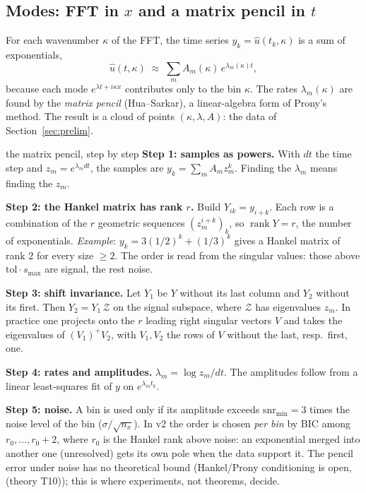 \documentclass[11pt,a4paper]{article}
\theoremstyle{definition}
\newcommand{\thy}[1]{\textcolor{cG}{\textsf{\footnotesize(theory #1)}}}
\begin{document}
\subsection{Modes: FFT in $x$ and a matrix pencil in $t$}\label{sec:modes}
For each wavenumber $\kappa$ of the FFT, the time series $y_k=\hat u(t_k,\kappa)$ is a sum of exponentials,
\begin{equation}\label{eq:expsum}
\hat u(t,\kappa)\;\approx\;\sum_{m}A_m(\kappa)\,e^{\lambda_m(\kappa)t},
\end{equation}
because each mode $e^{\lambda t+i\kappa x}$ contributes only to the bin $\kappa$. The rates $\lambda_m(\kappa)$ are found by the \emph{matrix pencil} (Hua--Sarkar), a linear-algebra form of Prony's method. The result is a cloud of points $(\kappa,\lambda,A)$: the data of Section~\ref{sec:prelim}.

\begin{explained}{the matrix pencil, step by step}
\textbf{Step 1: samples as powers.} With $dt$ the time step and $z_m=e^{\lambda_mdt}$, the samples are $y_k=\sum_mA_mz_m^k$. Finding the $\lambda_m$ means finding the $z_m$.

\medskip\textbf{Step 2: the Hankel matrix has rank $r$.} Build $Y_{ik}=y_{i+k}$. Each row is a combination of the $r$ geometric sequences $(z_m^{i+k})_k$, so $\operatorname{rank}Y=r$, the number of exponentials. \emph{Example}: $y_k=3(1/2)^k+(1/3)^k$ gives a Hankel matrix of rank $2$ for every size $\ge2$. The order is read from the singular values: those above $\text{tol}\cdot s_{\max}$ are signal, the rest noise.

\medskip\textbf{Step 3: shift invariance.} Let $Y_1$ be $Y$ without its last column and $Y_2$ without its first. Then $Y_2=Y_1\,\mathcal Z$ on the signal subspace, where $\mathcal Z$ has eigenvalues $z_m$. In practice one projects onto the $r$ leading right singular vectors $V$ and takes the eigenvalues of $(V_1)^{+}V_2$, with $V_1,V_2$ the rows of $V$ without the last, resp.\ first, one.

\medskip\textbf{Step 4: rates and amplitudes.} $\lambda_m=\log z_m/dt$. The amplitudes follow from a linear least-squares fit of $y$ on $e^{\lambda_mt_k}$.

\medskip\textbf{Step 5: noise.} A bin is used only if its amplitude exceeds $\mathrm{snr}_{\min}=3$ times the noise level of the bin ($\sigma/\sqrt{n_x}$). In v2 the order is chosen \emph{per bin} by BIC among $r_0,\dots,r_0+2$, where $r_0$ is the Hankel rank above noise: an exponential merged into another one (unresolved) gets its own pole when the data support it. The pencil error under noise has no theoretical bound (Hankel/Prony conditioning is open, \thy{T10}); this is where experiments, not theorems, decide.
\end{explained}
\end{document}
